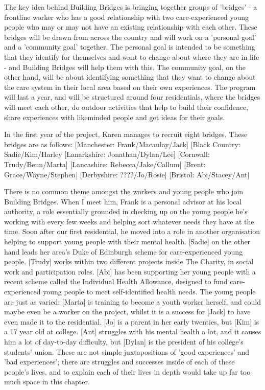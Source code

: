The key idea behind Building Bridges is bringing together groups of 'bridges' - a frontline worker who has a good relationship with two care-experienced young people who may or may not have an existing relationship with each other. These bridges will be drawn from across the country and will work on a 'personal goal' and  a 'community goal' together. The personal goal is intended to be something that they identify for themselves and want to change about where they are in life - and Building Bridges will help them with this. The community goal, on the other hand, will be about identifying something that they want to change about the care system in their local area based on their own experiences. The program will last a year, and will be structured around four residentials, where the bridges will meet each other, do outdoor activities that help to build their confidence, share experiences with likeminded people and get ideas for their goals. 

In the first year of the project, Karen manages to recruit eight bridges. These bridges are as follows:
[Manchester: Frank/Macaulay/Jack]
[Black Country: Sadie/Kim/Harley
[Lanarkshire: Jonathan/Dylan/Lee]
[Cornwall: Trudy/Benn/Marta]
[Lancashire: Rebecca/Jake/Callum]
[Brent: Grace/Wayne/Stephen]
[Derbyshire: ????/Jo/Rosie]
[Bristol: Abi/Stacey/Ant]

There is no common theme amongst the workers and young people who join Building Bridges. When I meet him, Frank is a personal advisor at his local authority, a role essentially grounded in checking up on the young people he's working with every few weeks and helping sort whatever needs they have at the time. Soon after our first residential, he moved into a role in another organisation helping to support young people with their mental health. [Sadie] on the other hand leads her area's Duke of Edinburgh scheme for care-experienced young people. [Trudy] works within two different projects inside The Charity, in social work and participation roles. [Abi] has been supporting her young people with a recent scheme called the Individual Health Allowance, designed to fund care-experienced young people to meet self-identified health needs. The young people are just as varied: [Marta] is training to become a youth worker herself, and could maybe even be a worker on the project, whilst it is a success for [Jack] to have even made it to the residential. [Jo] is a parent in her early twenties, but [Kim] is a 17 year old at college. [Ant] struggles with his mental health a lot, and it causes him a lot of day-to-day difficulty, but [Dylan] is the president of his college's students' union. These are not simple juxtapositions of 'good experiences' and 'bad experiences'; there are struggles and successes inside of each of these people's lives, and to explain each of their lives in depth would take up far too much space in this chapter. 

